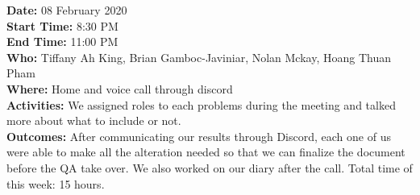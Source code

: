\documentclass[12pt]{article}
\begin{document}
{\bf Date:} 08 February 2020\\
{\bf Start Time:} 8:30 PM\\
{\bf End Time:} 11:00 PM \\
{\bf Who:} Tiffany Ah King, Brian Gamboc-Javiniar, Nolan Mckay, Hoang Thuan Pham\\
{\bf Where:} Home and voice call through discord \\
{\bf Activities:} We assigned roles to each problems during the meeting and talked more about what to include or not. \\
{\bf Outcomes:} After communicating our results through Discord, each one of us were able to make all the alteration needed so that we can finalize the document before the QA take over. We also worked on our diary after the call. Total time of this week: 15 hours.\\




\end{document}
